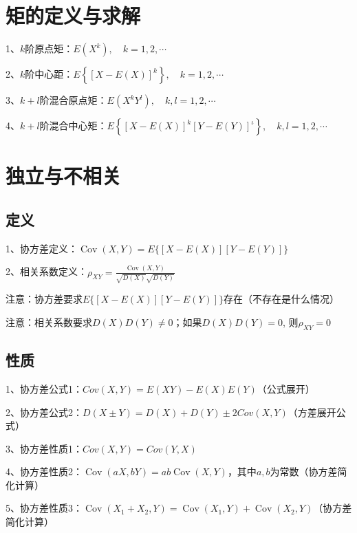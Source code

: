 \section{矩的定义与求解}

1、$k$阶原点矩：$E\left(X^{k}\right), \quad k=1,2, \cdots $

2、$k$阶中心距：$E\left\{[X-E(X)]^{k}\right\}, \quad k=1,2, \cdots$

3、$k+l$阶混合原点矩：$E\left(X^{k} Y^{l}\right), \quad k, l=1,2, \cdots$

4、$k+l$阶混合中心矩：$E\left\{[X-E(X)]^{k}[Y-E(Y)]^{\iota}\right\}, \quad k, l=1,2, \cdots$

\section{独立与不相关}



\subsection{定义}

1、协方差定义：$\operatorname{Cov}(X, Y)=E\{[X-E(X)][Y-E(Y)]\}$

2、相关系数定义：$\rho_{X Y}=\frac{\operatorname{Cov}(X, Y)}{\sqrt{D(X)} \sqrt{D(Y)}}$

注意：协方差要求$E\{[X-E(X)][Y-E(Y)]\}$存在（不存在是什么情况）

注意：相关系数要求$D(X) D(Y) \neq 0$；如果$D(X) D(Y)=0$, 则$\rho_{X Y}=0$



\subsection{性质}

1、协方差公式1：$C o v ( X , Y ) = E ( X Y ) - E ( X ) E ( Y ) $（公式展开）

2、协方差公式2：$D ( X \pm Y ) = D ( X ) + D ( Y ) \pm 2 Cov ( X , Y )  $（方差展开公式）

3、协方差性质1：$Cov(X, Y)=Cov(Y, X)$

4、协方差性质2：$\operatorname{Cov}(a X, b Y)=a b \operatorname{Cov}(X, Y)$，其中$a,b$为常数（协方差简化计算）

5、协方差性质3：$\operatorname{Cov}\left(X_{1}+X_{2}, Y\right)=\operatorname{Cov}\left(X_{1}, Y\right)+\operatorname{Cov}\left(X_{2}, Y\right)$（协方差简化计算）



